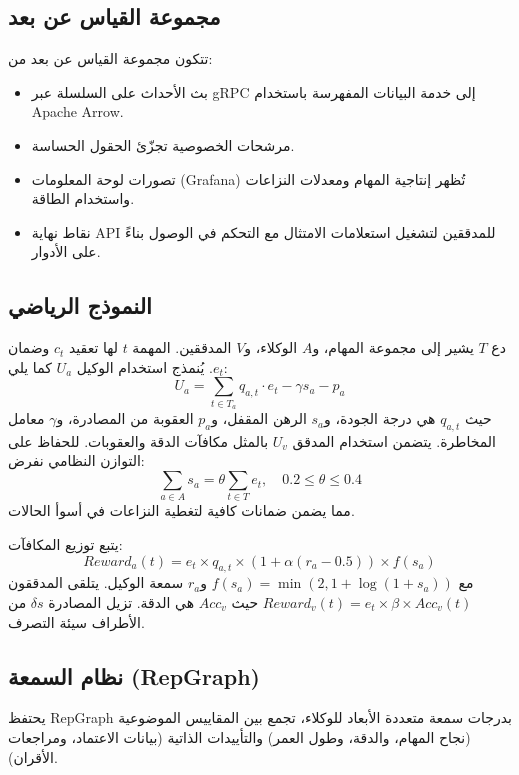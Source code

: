 \documentclass[11pt]{article}
\begin{document}
\subsection{مجموعة القياس عن بعد}
تتكون مجموعة القياس عن بعد من:
\begin{itemize}[noitemsep]
  \item بث الأحداث على السلسلة عبر gRPC إلى خدمة البيانات المفهرسة باستخدام Apache Arrow.
  \item مرشحات الخصوصية تجزّئ الحقول الحساسة.
  \item تصورات لوحة المعلومات (Grafana) تُظهر إنتاجية المهام ومعدلات النزاعات واستخدام الطاقة.
  \item نقاط نهاية API للمدققين لتشغيل استعلامات الامتثال مع التحكم في الوصول بناءً على الأدوار.
\end{itemize}

\subsection{النموذج الرياضي}
دع $T$ يشير إلى مجموعة المهام، و$A$ الوكلاء، و$V$ المدققين. المهمة $t$ لها تعقيد $c_t$ وضمان $e_t$. يُنمذج استخدام الوكيل $U_a$ كما يلي:
\begin{equation}
U_a = \sum_{t \in T_a} q_{a,t}\cdot e_t - \gamma s_a - p_a\label{eq:agent-utility}
\end{equation}
حيث $q_{a,t}$ هي درجة الجودة، و$s_a$ الرهن المقفل، و$p_a$ العقوبة من المصادرة، و$\gamma$ معامل المخاطرة. يتضمن استخدام المدقق $U_v$ بالمثل مكافآت الدقة والعقوبات. للحفاظ على التوازن النظامي نفرض:
\begin{equation}
\sum_{a \in A} s_a = \theta \sum_{t \in T} e_t,\quad 0.2 \leq \theta \leq 0.4
\end{equation}
مما يضمن ضمانات كافية لتغطية النزاعات في أسوأ الحالات.

يتبع توزيع المكافآت:
\begin{equation}
Reward_a(t) = e_t \times q_{a,t} \times \left(1 + \alpha (r_a - 0.5)\right) \times f(s_a)
\end{equation}
مع $f(s_a) = \min(2, 1 + \log(1+s_a))$ و$r_a$ سمعة الوكيل. يتلقى المدققون $Reward_v(t) = e_t \times \beta \times Acc_v(t)$ حيث $Acc_v$ هي الدقة. تزيل المصادرة $\delta s$ من الأطراف سيئة التصرف.

\subsection{نظام السمعة (RepGraph)}
\label{sec:reputation}
يحتفظ RepGraph بدرجات سمعة متعددة الأبعاد للوكلاء، تجمع بين المقاييس الموضوعية (نجاح المهام، والدقة، وطول العمر) والتأييدات الذاتية (بيانات الاعتماد، ومراجعات الأقران).
\end{document}
